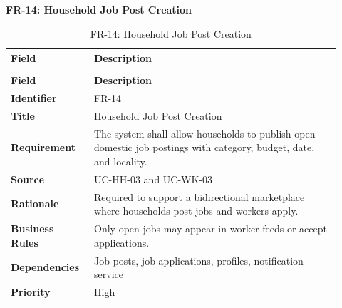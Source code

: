 \documentclass[12pt,a4paper]{article}
\begin{document}
\noindent\textbf{FR-14: Household Job Post Creation}\par
\vspace{4pt}
\begingroup\small\setlength{\tabcolsep}{4pt}\renewcommand{\arraystretch}{1.15}
\begin{longtable}{|>{\raggedright\arraybackslash}p{0.22\linewidth}|>{\raggedright\arraybackslash}p{0.70\linewidth}|}
\caption{FR-14: Household Job Post Creation}\label{tab:fr-14}\\
\hline
\textbf{Field} & \textbf{Description} \\ \hline
\endfirsthead
\multicolumn{2}{c}{Table \thetable\ Household Job Post Creation (continued)}\\
\hline
\textbf{Field} & \textbf{Description} \\ \hline
\endhead
\textbf{Identifier} & FR-14 \\ \hline
\textbf{Title} & Household Job Post Creation \\ \hline
\textbf{Requirement} & The system shall allow households to publish open domestic job postings with category, budget, date, and locality. \\ \hline
\textbf{Source} & UC-HH-03 and UC-WK-03 \\ \hline
\textbf{Rationale} & Required to support a bidirectional marketplace where households post jobs and workers apply. \\ \hline
\textbf{Business Rules} & Only open jobs may appear in worker feeds or accept applications. \\ \hline
\textbf{Dependencies} & Job posts, job applications, profiles, notification service \\ \hline
\textbf{Priority} & High \\ \hline
\end{longtable}
\endgroup
\clearpage
\end{document}
